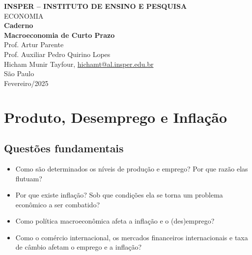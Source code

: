 \documentclass[a4paper,12pt]{article}[abntex2]
\begin{document}
\begin{titlepage}
    \centering
    \vspace*{1cm}
    \Large\textbf{INSPER – INSTITUTO DE ENSINO E PESQUISA}\\
    \Large ECONOMIA\\
    \vspace{1.5cm}
    \Large\textbf{Caderno}\\
    \textbf{Macroeconomia de Curto Prazo}\\
    \vspace{1.5cm}
    Prof. Artur Parente  \\
    Prof. Auxiliar  Pedro Quirino Lopes\\
    \vfill
    \normalsize
    Hicham Munir Tayfour, \href{mailto:hichamt@al.insper.edu.br}{hichamt@al.insper.edu.br}\\

    \vfill
    São Paulo\\
    Fevereiro/2025
\end{titlepage}

\newpage
\tableofcontents
\thispagestyle{empty} %

\newpage 
\listoffigures
\thispagestyle{empty} %

\newpage
\setcounter{page}{1} %
\justify
\onehalfspacing


\section{\textbf{Produto, Desemprego e Inflação}}
\subsection{\textbf{Questões fundamentais}} \begin{itemize}
\item Como são determinados os níveis de produção e emprego? Por que razão elas flutuam?

\item Por que existe inflação? Sob que condições ela se torna um problema econômico a ser combatido?

\item Como política macroeconômica afeta a inflação e o (des)emprego?

\item Como o comércio internacional, os mercados financeiros internacionais e taxa de câmbio afetam o emprego e a inflação?

\end{itemize}
\end{document}
